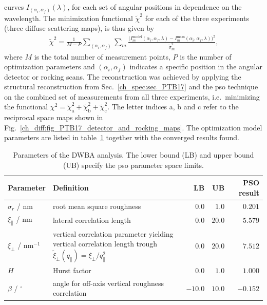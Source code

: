 curves $I_{(\alpha_i, \alpha_f)}(\lambda)$, for each set of angular positions in dependence on the wavelength. The minimization functional $\tilde{\chi}^2$ for each of the three experiments (three diffuse scattering maps), is thus given by
\begin{align}
 \tilde{\chi}^2 = \frac{1}{M-P} \sum\limits_{(\alpha_i, \alpha_f)} \sum\limits_{m} \frac{\big(I_m^\text{model}(\alpha_i, \alpha_f, \lambda)
- I_m^\text{meas}(\alpha_i, \alpha_f, \lambda)\big)^2}{\tilde{\sigma}_m^2} \text{,} \label{ch_diff:eqn_chi_diffuse}
\end{align}
where $M$ is the total number of measurement points, $P$ is the number of optimization parameters and $(\alpha_i, \alpha_f)$ indicates a specific position in the angular detector or rocking scans. The reconstruction was achieved by applying the structural reconstruction from Sec.~\ref{ch_spec:sec_PTB17} and the \gls{pso} technique on the combined set of measurements from all three experiments, i.e.~minimizing the functional $\chi^2 = \tilde{\chi}^2_\text{a} + \tilde{\chi}^2_\text{b} + \tilde{\chi}^2_\text{c}$. The letter indices a, b and c refer to the reciprocal space maps shown in Fig.~\ref{ch_diff:fig_PTB17_detector_and_rocking_maps}. The optimization model parameters are listed in table~\ref{ch_diff:tbl_PTB17_diffuse_optimization_limits_and_results} together with the converged results found.
\begin{table}
\centering
\caption[Parameters and limits of the DWBA analysis.]{Parameters of the DWBA analysis. The lower bound (LB) and upper bound (UB) specify the \gls{pso} parameter space limits.}
\label{ch_diff:tbl_PTB17_diffuse_optimization_limits_and_results}
\begin{tabularx}{\textwidth}{@{}lXrrr@{}}
\toprule
Parameter & Definition & LB & UB & PSO result\\ \midrule
$\sigma_r$ / nm & root mean square roughness & $0.0$& $1.0$ & $0.201$\\ 
$\xi_\parallel$ / nm & lateral correlation length & $0.0$& $20.0$ & $5.579$\\ 
$\xi_\perp$ / nm$^{-1}$ &vertical correlation parameter yielding vertical correlation length trough $\tilde{\xi}_\perp(q_\parallel) = \xi_\perp/q_\parallel^2$ &$0.0$ & $20.0$ & $7.512$\\
$H$ & Hurst factor & $0.0$ & $1.0$ & $1.000$ \\
$\beta$ / $^\circ$&angle for off-axis vertical roughness correlation& $-10.0$ & $10.0$ & $-0.152$\\ 
 \bottomrule
\end{tabularx}
\end{table}
